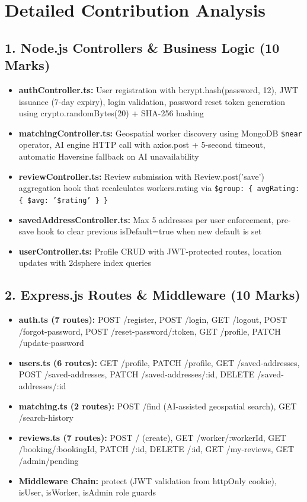 \documentclass[12pt,a4paper]{article}
\begin{document}
\newpage

\section*{Detailed Contribution Analysis}

\subsection*{1. Node.js Controllers \& Business Logic (10 Marks)}
\begin{itemize}[leftmargin=*]
    \item \textbf{authController.ts:} User registration with bcrypt.hash(password, 12), JWT issuance (7-day expiry), login validation, password reset token generation using crypto.randomBytes(20) + SHA-256 hashing
    \item \textbf{matchingController.ts:} Geospatial worker discovery using MongoDB \texttt{\$near} operator, AI engine HTTP call with axios.post + 5-second timeout, automatic Haversine fallback on AI unavailability
    \item \textbf{reviewController.ts:} Review submission with Review.post('save') aggregation hook that recalculates workers.rating via \texttt{\$group: \{ avgRating: \{ \$avg: '\$rating' \} \}}
    \item \textbf{savedAddressController.ts:} Max 5 addresses per user enforcement, pre-save hook to clear previous isDefault=true when new default is set
    \item \textbf{userController.ts:} Profile CRUD with JWT-protected routes, location updates with 2dsphere index queries
\end{itemize}

\subsection*{2. Express.js Routes \& Middleware (10 Marks)}
\begin{itemize}[leftmargin=*]
    \item \textbf{auth.ts (7 routes):} POST /register, POST /login, GET /logout, POST /forgot-password, POST /reset-password/:token, GET /profile, PATCH /update-password
    \item \textbf{users.ts (6 routes):} GET /profile, PATCH /profile, GET /saved-addresses, POST /saved-addresses, PATCH /saved-addresses/:id, DELETE /saved-addresses/:id
    \item \textbf{matching.ts (2 routes):} POST /find (AI-assisted geospatial search), GET /search-history
    \item \textbf{reviews.ts (7 routes):} POST / (create), GET /worker/:workerId, GET /booking/:bookingId, PATCH /:id, DELETE /:id, GET /my-reviews, GET /admin/pending
    \item \textbf{Middleware Chain:} protect (JWT validation from httpOnly cookie), isUser, isWorker, isAdmin role guards
\end{itemize}
\end{document}
